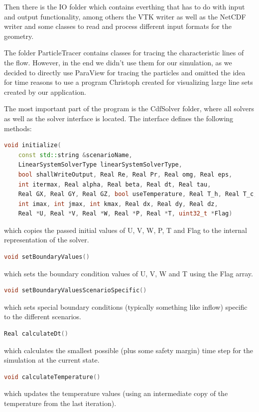 \documentclass{article}%
\begin{document}
Then there is the IO folder which contains everthing that has to do with input and output functionality, among others the VTK writer as well as the NetCDF writer and some classes to read and process different input formats for the geometry.

The folder ParticleTracer contains classes for tracing the characteristic lines of the flow. However, in the end we didn't use them for our simulation, as we decided to directly use ParaView for tracing the particles and omitted the idea for time reasons to use a program Christoph created for visualizing large line sets created by our application.

The most important part of the program is the CdfSolver folder, where all solvers as well as the solver interface is located. The interface defines the following methods:\pagebreak

\begin{lstlisting}[language=C++,frame=single]
void initialize(
    const std::string &scenarioName,
    LinearSystemSolverType linearSystemSolverType,
    bool shallWriteOutput, Real Re, Real Pr, Real omg, Real eps,
    int itermax, Real alpha, Real beta, Real dt, Real tau,
    Real GX, Real GY, Real GZ, bool useTemperature, Real T_h, Real T_c,
    int imax, int jmax, int kmax, Real dx, Real dy, Real dz,
    Real *U, Real *V, Real *W, Real *P, Real *T, uint32_t *Flag)
\end{lstlisting}
which copies the passed initial values of U, V, W, P, T and Flag to the internal representation of the solver.

\begin{lstlisting}[language=C++,frame=single]
void setBoundaryValues()
\end{lstlisting}
which sets the boundary condition values of U, V, W and T using the Flag array.

\begin{lstlisting}[language=C++,frame=single]
void setBoundaryValuesScenarioSpecific()
\end{lstlisting}
which sets special boundary conditions (typically something like inflow) specific to the different scenarios.

\begin{lstlisting}[language=C++,frame=single]
Real calculateDt()
\end{lstlisting}
which calculates the smallest possible (plus some safety margin) time step for the simulation at the current state.

\begin{lstlisting}[language=C++,frame=single]
void calculateTemperature()
\end{lstlisting}
which updates the temperature values (using an intermediate copy of the temperature from the last iteration).
\end{document}
